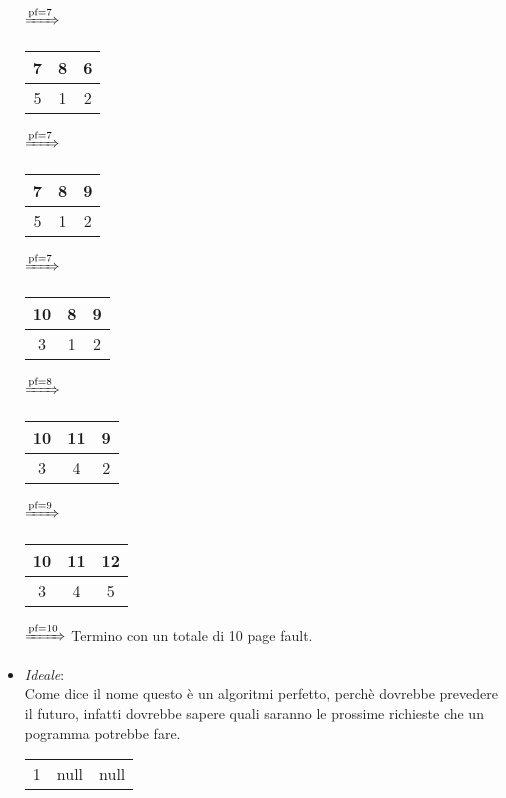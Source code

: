 \documentclass{article}
\begin{document}
\begin{itemize}
\begin{tabular}{|c|c|c|}
            \end{tabular}
            $\xRightarrow{\text{pf}=7}$
            \begin{tabular}{|c|c|c|}
                \hline
                7 & 8 & 6\\
                \hline
                5 & 1 & 2\\
                \hline
            \end{tabular}
            $\xRightarrow{\text{pf}=7}$
            \begin{tabular}{|c|c|c|}
                \hline
                7 & 8 & 9\\
                \hline
                5 & 1 & 2\\
                \hline
            \end{tabular}
            $\xRightarrow{\text{pf}=7}$
            \begin{tabular}{|c|c|c|}
                \hline
                10 & 8 & 9\\
                \hline
                3 & 1 & 2\\
                \hline
            \end{tabular}
            $\xRightarrow{\text{pf}=8}$
            \begin{tabular}{|c|c|c|}
                \hline
                10 & 11 & 9\\
                \hline
                3 & 4 & 2\\
                \hline
            \end{tabular}
            $\xRightarrow{\text{pf}=9}$
            \begin{tabular}{|c|c|c|}
                \hline
                10 & 11 & 12\\
                \hline
                3 & 4 & 5\\
                \hline
            \end{tabular}
            $\xRightarrow{\text{pf}=10}$
            Termino con un totale di 10 page fault.
        \item \emph{Ideale}:\\
            Come dice il nome questo è un algoritmi perfetto, perchè dovrebbe prevedere il futuro, infatti dovrebbe sapere quali saranno le prossime richieste che un pogramma potrebbe fare.\\
            \begin{tabular}{|c|c|c|}
                \hline
                1 & null & null\\

\end{tabular}
\end{itemize}
\end{document}
